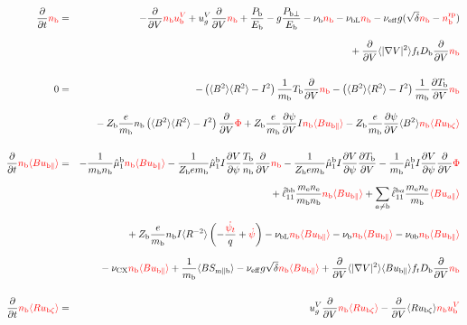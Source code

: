 \documentclass[11pt]{article}
\def\r#1{{\rm#1}}
\def\aves#1{\langle#1\rangle}
\def\dd#1#2{\frac{\partial #1}{\partial #2}}
\def\para{\parallel}
\def\ddV{\frac{\partial}{\partial V}}
\def\psid{\dot{\psi}}
\def\psit{\psi_t}
\def\psitd{\dot{\psit}}
\def\me{m_\r{e}}
\def\mb{m_\r{b}}
\def\nee{n_\r{e}}
\def\nb{n_\r{b}}
\def\Tb{T_\r{b}}
\def\Zb{Z_\r{b}}
\def\Pb{P_\r{b}}
\def\Eb{E_\r{b}}
\def\ubzt{u_{\r{b}\zeta}}
\def\ubpara{u_{\r{b}\para}}
\def\ubV{u_\r{b}^V}
\def\ugV{u_{g}^V}
\def\bri{\aves{B^2}\aves{R^2} - I^2}
\def\ddt{\frac{\partial}{\partial t}}
\def\nbrp{n_\r{b}^\r{rp}}
\def\Pbpara{P_{\r{b}\parallel}}
\def\Pbperp{P_{\r{b}\perp}}
\def\nueff{\nu_\r{eff}}
\def\Db{D_\r{b}}
\def\nunb{\nu_\r{0b}}
\def\nuCX{\nu_\r{CX}}
\def\nub{\nu_\r{b}}
\def\nubL{\nu_\r{bL}}
\def\red#1{\textcolor{red}{#1}}
\begin{document}
%
\begin{eqnarray}
  \ddt \red{\nb} &=&
%
  - \ddV \red{\nb\ubV}
%
  + \ugV \ddV \red{\nb}
%
  +  \frac{\Pb}{\Eb}
%
  - g \frac{\Pbperp}{\Eb}
%
  - \nub \red{\nb}
%
  - \nubL \red{\nb}
%
  - \nueff g (\sqrt{\delta} \red{\nb} - \red{\nbrp})
%
\nonumber\\[2.5mm]&&{}
  + \ddV \aves{|\nabla V|^2} f_t \Db \ddV \red{\nb}
%
\\[5mm]
  0 &=&
%
  -           \left( \bri \right) \frac{1}{\mb} \Tb \ddV \red{\nb}
  -           \left( \bri \right) \frac{1}{\mb} \dd{\Tb}{V} \red{\nb}
\nonumber\\[3mm]&&{}
%
  - \Zb \frac{e}{\mb} \nb \left( \bri \right) \ddV \red{\Phi}
%
  + \Zb \frac{e}{\mb} \dd{\psi}{V} I \red{\nb \aves{B\ubpara}}
%
  - \Zb \frac{e}{\mb} \dd{\psi}{V} \aves{B^2} \red{\nb \aves{R\ubzt}}
\\[5mm]
  \ddt \red{\nb \aves{B \ubpara}} &=&
%
  - \frac{1}{\mb \nb} \hat{\mu}_1^\r{b} \red{\nb \aves{B \ubpara}}
%
  - \frac{1}{\Zb e\mb} \hat{\mu}_1^\r{b} I \dd{V}{\psi} \frac{\Tb}{\nb}
  \ddV \red{\nb}
  - \frac{1}{\Zb e\mb} \hat{\mu}_1^\r{b} I \dd{V}{\psi} \dd{\Tb}{V}
  - \frac{1}{\mb} \hat{\mu}_1^\r{b} I \dd{V}{\psi} \ddV \red{\Phi}
\nonumber\\[2.5mm]&&{}
%
  + \hat{\ell}_{11}^\r{bb} \frac{\me\nee}{\mb\nb} \red{\nb \aves{B \ubpara}}
%
  + \sum_{a\neq\r{b}} \hat{\ell}_{11}^{\r{b}a} \frac{\me\nee}{\mb} \red{\aves{B u_{a\para}}}
\nonumber\\[2.5mm]&&{}
%
  + \Zb \frac{e}{\mb} \nb I \aves{R^{-2}} \left( - \frac{\red{\psitd}}{q} + \red{\psid} \right)
%
  - \nubL \red{\nb \aves{B\ubpara}}
%
  - \nub  \red{\nb \aves{B \ubpara}}
%
  - \nunb \red{\nb \aves{B\ubpara}}
\nonumber\\[2.5mm]&&{}
%
  - \nuCX \red{\nb \aves{B\ubpara}}
%
%
  + \frac{1}{\mb} \aves{B S_{\r{m}\para\r{b}}}
%
  - \nueff g \sqrt{\delta} \red{\nb \aves{B\ubpara}}
%
  + \ddV \aves{|\nabla V|^2} \aves{B\ubpara} f_t \Db \ddV \red{\nb}
\\[5mm]
  \ddt \red{\nb \aves{R \ubzt}} &=&
%
  \ugV \ddV \red{\nb \aves{R \ubzt}}
%
  - \ddV \aves{R \ubzt} \red{\nb \ubV} 
%

\end{eqnarray}
\end{document}
